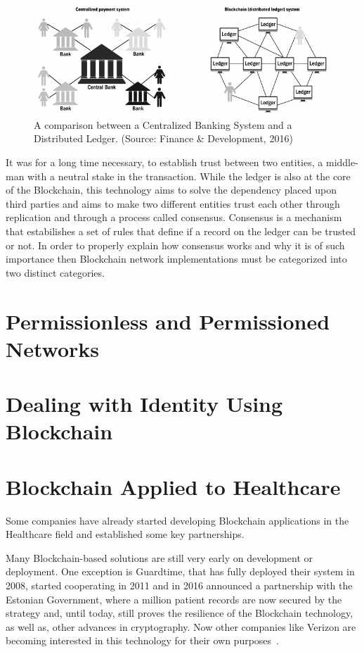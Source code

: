 \begin{figure}[h]
  \centering
  \includegraphics[width=1\linewidth]{imgs/blockchainvscentralizedNetwork.png}
  \caption{\label{fig:centralizedvsdescentralized} A comparison between a
  Centralized Banking System and a Distributed Ledger. (Source: Finance \&
  Development, 2016)}
\end{figure}

It was for a long time necessary, to establish trust between two entities, a
middle-man with a neutral stake in the transaction. While the ledger is also at
the core of the Blockchain, this technology aims to solve the dependency placed
upon third parties and aims to make two different entities trust each other
through replication and through a process called consensus.  Consensus is a
mechanism that estabilishes a set of rules that define if a record on the
ledger can be trusted or not. In order to properly explain how consensus works
and why it is of such importance then Blockchain network implementations must
be categorized into two distinct categories.

\section{Permissionless and Permissioned Networks}

\section{Dealing with Identity Using Blockchain}

\section{Blockchain Applied to Healthcare}

Some companies have already started developing Blockchain applications in the
Healthcare field and established some key partnerships.

Many Blockchain-based solutions are still very early on development or
deployment.  One exception is Guardtime, that has fully deployed their system
in 2008, started cooperating in 2011 and in 2016 announced a partnership with
the Estonian Government, where a million patient records are now secured by the
strategy and, until today, still proves the resilience of the Blockchain
technology, as well as, other advances in cryptography.  Now other companies
like Verizon are becoming interested in this technology for their own
purposes~\cite{GuardTime2018,EstonianGovernmentGuardTime2016}.

